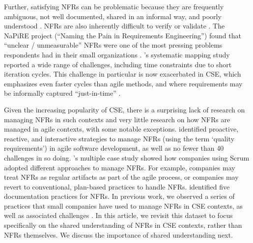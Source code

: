 \documentclass[smallextended]{svjour3}
\begin{document}
Further, satisfying NFRs can be problematic because they are frequently ambiguous, not well documented, shared in an informal way, and poorly understood \citep{chung2012non, ameller_how_2012,ameller2012non}. NFRs are also inherently difficult to verify or validate \citep{borg2003bad, jiang_co-evolution_2015}.
The NaPiRE project (``Naming the Pain in Requirements Engineering'') \citep{Fernandez2018,wagner2019status} 
found that ``unclear / unmeasurable'' NFRs were one of the most pressing problems respondents had in their small organizations \citep{mendez2017naming}. 
\cite{behutiye2020management}'s systematic mapping study reported 
a wide range of challenges, including time constraints due to short iteration cycles. 
This challenge in particular is now exacerbated in CSE, which emphasizes even faster cycles than agile methods, and where requirements may be informally captured ``just-in-time'' \citep{ernst_case_2012}.


Given the increasing popularity of CSE, there is a surprising lack of research on managing NFRs in such contexts and very little research on how NFRs are managed in agile contexts, with some notable exceptions. \cite{karhapaa2021strategies} identified proactive, reactive, and interactive strategies to manage NFRs (using the term `quality requirements') in agile software development, as well as no fewer than 40 challenges in so doing. 
\cite{rahy2022managing}'s multiple case study showed how companies using Scrum adopted different approaches to manage NFRs. For example, companies may treat NFRs as regular artifacts as part of the agile process, or companies may revert to conventional, plan-based practices to handle NFRs. \cite{nasir2023exploratory} identified five documentation practices for NFRs.
In previous work, we observed a series of practices that small companies have used to manage NFRs in CSE contexts, as well as associated challenges \citep{werner_tse_2021}.  
In this article, we revisit this dataset to focus specifically on the shared understanding of NFRs in CSE contexts, rather than NFRs themselves. We discuss the importance of shared understanding next.
\end{document}
